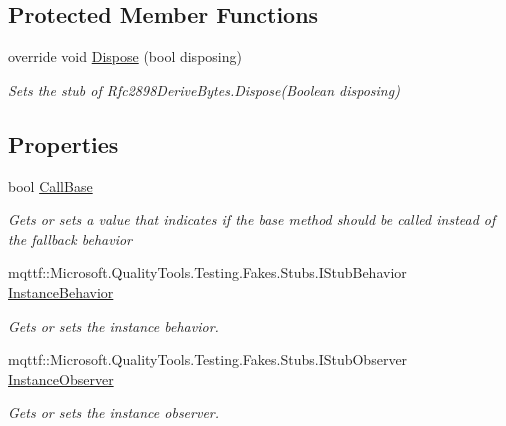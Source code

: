 \subsection*{Protected Member Functions}
\begin{DoxyCompactItemize}
\item 
override void \hyperlink{class_system_1_1_security_1_1_cryptography_1_1_fakes_1_1_stub_rfc2898_derive_bytes_aa72144a7baffc732763afa58ca7861f0}{Dispose} (bool disposing)
\begin{DoxyCompactList}\small\item\em Sets the stub of Rfc2898\-Derive\-Bytes.\-Dispose(\-Boolean disposing)\end{DoxyCompactList}\end{DoxyCompactItemize}
\subsection*{Properties}
\begin{DoxyCompactItemize}
\item 
bool \hyperlink{class_system_1_1_security_1_1_cryptography_1_1_fakes_1_1_stub_rfc2898_derive_bytes_aac7193bf764bd6eb960c5b1aad7822e3}{Call\-Base}
\begin{DoxyCompactList}\small\item\em Gets or sets a value that indicates if the base method should be called instead of the fallback behavior\end{DoxyCompactList}\item 
mqttf\-::\-Microsoft.\-Quality\-Tools.\-Testing.\-Fakes.\-Stubs.\-I\-Stub\-Behavior \hyperlink{class_system_1_1_security_1_1_cryptography_1_1_fakes_1_1_stub_rfc2898_derive_bytes_affe52e8c35c7d9075b3342fa63888ed0}{Instance\-Behavior}
\begin{DoxyCompactList}\small\item\em Gets or sets the instance behavior.\end{DoxyCompactList}\item 
mqttf\-::\-Microsoft.\-Quality\-Tools.\-Testing.\-Fakes.\-Stubs.\-I\-Stub\-Observer \hyperlink{class_system_1_1_security_1_1_cryptography_1_1_fakes_1_1_stub_rfc2898_derive_bytes_a8858032aa910f36952ed16946ec838a0}{Instance\-Observer}
\begin{DoxyCompactList}\small\item\em Gets or sets the instance observer.\end{DoxyCompactList}\end{DoxyCompactItemize}


